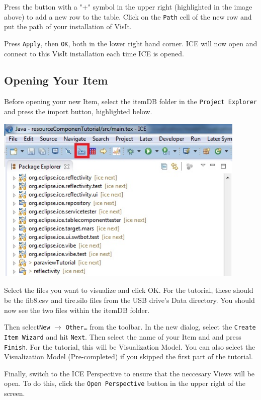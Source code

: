 Press the button with a "+" symbol in the upper right (highlighted in the image
above) to add a new row to the table. Click on the \texttt{Path} cell of the new
row and put the path of your installation of VisIt.

Press \texttt{Apply}, then \texttt{OK}, both in the lower right hand corner. ICE
will now open and connect to this VisIt installation each time ICE is opened.

\subsection{Opening Your Item}
Before opening your new Item, select the itemDB folder in the \texttt{Project
Explorer} and press the import button, highlighted below.

\begin{center}
\includegraphics[width=12cm]{images/ImportButton}
\end{center}

Select the files you want to visualize and click OK. For the tutorial, these
should be the fib8.csv and tire.silo files from the USB drive's Data directory.
You should now see the two files within the itemDB folder.

Then select\texttt{New} $\rightarrow$ \texttt{Other\ldots} from the toolbar. In
the new dialog, select the \texttt{Create Item Wizard} and hit \texttt{Next}.
Then select the name of your Item and and press \texttt{Finish}. For the
tutorial, this will be Visualization Model. You can also select the
Visualization Model (Pre-completed) if you skipped the first part of the
tutorial.

Finally, switch to the ICE Perspective to ensure that the neccesary Views will
be open. To do this, click the \texttt{Open Perspective} button in the upper right
of the screen.

